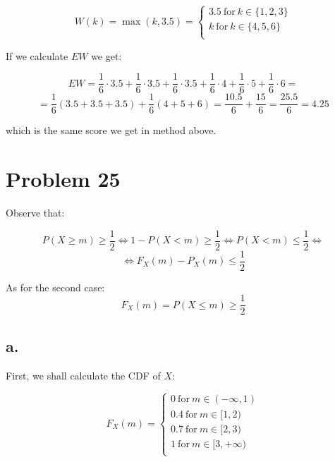 \documentclass{article}
\begin{document}
\begin{equation*}
    W(k) = \max(k, 3.5) =
    \begin{cases}
        3.5 \ \mbox{for} \  k \in \{1, 2, 3\} \\
        k \ \mbox{for} \  k \in \{4, 5, 6\} \\
    \end{cases}
\end{equation*}

If we calculate \(EW\) we get:

\begin{equation*}
    EW = \frac{1}{6} \cdot 3.5 + \frac{1}{6} \cdot 3.5 + \frac{1}{6} \cdot 3.5 + \frac{1}{6} \cdot 4 + \frac{1}{6} \cdot 5 + \frac{1}{6} \cdot 6 =
\end{equation*}
\begin{equation*}
    = \frac{1}{6}(3.5 + 3.5 + 3.5) + \frac{1}{6}(4 + 5 + 6) = \frac{10.5}{6} + \frac{15}{6} = \frac{25.5}{6} = 4.25
\end{equation*}

which is the same score we get in method above.


\section*{Problem 25}

Observe that:

\begin{equation*}
    P(X \geq m) \geq \frac{1}{2} \iff 1 - P(X < m) \geq \frac{1}{2} \iff P(X < m) \leq \frac{1}{2} \iff 
\end{equation*}
\begin{equation*}
    \iff F_{X}(m) - P_{X}(m) \leq \frac{1}{2} \label{median_first_case} \tag{44}
\end{equation*}

As for the second case:
\begin{equation*}
    F_{X}(m) = P(X \leq m) \geq \frac{1}{2} \label{median_second_case} \tag{69}
\end{equation*}

\subsection*{a.}

First, we shall calculate the CDF of \(X\):

\begin{equation*}
    F_{X}(m) = 
    \begin{cases}
        0 \ \mbox{for} \ m \in  (- \infty, 1) \\
        0.4 \ \mbox{for} \ m \in  [1, 2) \\
        0.7 \ \mbox{for} \ m \in  [2, 3) \\
        1 \ \mbox{for} \ m \in [3, + \infty) \\
    \end{cases}
\end{equation*}
\end{document}
